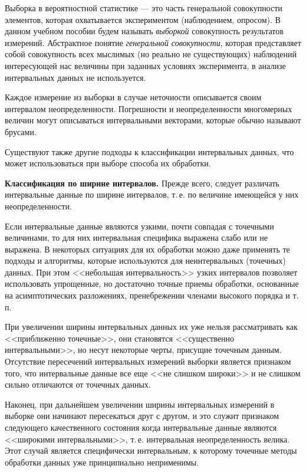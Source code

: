 \documentclass[a5paper,openany]{book}
\begin{document}
{{Выборка в вероятностной статистике --- это часть генеральной совокупности элементов, которая охватывается экспериментом (наблюдением, опросом). 
В данном учебном пособии будем называть \textit{выборкой}  
совокупность результатов измерений. Абстрактное понятие \emph{генеральной совокупности}, 
которая представляет собой совокупность всех мыслимых (но реально не существующих) 
наблюдений интересующей нас величины при заданных условиях эксперимента, в анализе 
интервальных данных не используется.  

Каждое измерение из выборки в случае неточности описывается своим интервалом 
неопределенности. Погрешности и неопределенности многомерных величин могут описываться 
интервальными векторами, которые обычно называют брусами. 

Существуют также другие подходы к классификации интервальных данных, что может использоваться при выборе способа их обработки. 

{\bf Классификация по ширине интервалов.}  \label{InteWidClass}
Прежде всего, следует различать интервальные данные по ширине интервалов, 
т.\,е. по величине имеющейся у них неопределенности. 

Если интервальные данные являются узкими, почти совпадая 
с точечными величинами, то для них интервальная специфика выражена слабо или не выражена. В некоторых ситуациях для их обработки можно даже применять те подходы 
и алгоритмы, которые используются для неинтервальных (точечных) данных. При этом 
<<небольшая интервальность>> узких интервалов позволяет использовать упрощенные, но 
достаточно точные приемы обработки, основанные на асимптотических разложениях, пренебрежении 
членами высокого порядка и т.\,п. 

При увеличении ширины интервальных данных их  уже нельзя рассматривать как 
<<приближенно точечные>>, они становятся <<существенно интервальными>>,  
но несут некоторые черты, присущие точечным данным. Отсутствие пересечений интервальных измерений выборки является признаком того, что интервальные данные все еще <<не слишком широки>> и не слишком сильно отличаются от точечных данных. 

Наконец, при дальнейшем увеличении ширины интервальных измерений в выборке они начинают 
пересекаться друг с другом, и это служит признаком следующего качественного состояния
когда интервальные данные являются <<широкими интервальными>>, т.\,е. интервальная 
неопределенность велика. Этот случай является специфически интервальным, к которому 
точечные методы обработки данных уже принципиально неприменимы. 

}}
\end{document}
